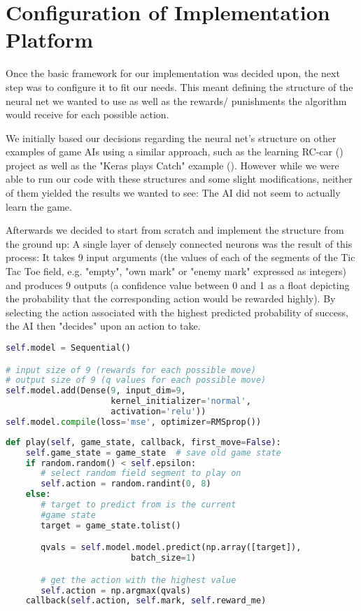 \section{Configuration of Implementation Platform}

Once the basic framework for our implementation was decided upon, the next step was to configure it to fit our needs. This meant defining the structure of the neural net we wanted to use as well as the rewards/ punishments the algorithm would receive for each possible action.

We initially based our decisions regarding the neural net's structure on other examples of game \ac{AI}s using a similar approach, such as the learning RC-car (\cite{Harvey2017}) project as well as the "Keras plays Catch" example (\cite{Santana17}). However while we were able to run our code with these structures and some slight modifications, neither of them yielded the results we wanted to see: The \ac{AI} did not seem to actually learn the game.

Afterwards we decided to start from scratch and implement the structure from the ground up: A single layer of densely connected neurons was the result of this process: It takes 9 input arguments (the values of each of the segments of the Tic Tac Toe field, e.g. "empty", "own mark" or "enemy mark" expressed as integers) and produces 9 outputs (a confidence value between 0 and 1 as a float depicting the probability that the corresponding action would be rewarded highly). By selecting the action associated with the highest predicted probability of success, the \ac{AI} then "decides" upon an action to take.
\begin{lstlisting}[frame=single,language=Python,caption={Creation of our neural network},captionpos=b]
self.model = Sequential()

# input size of 9 (rewards for each possible move)
# output size of 9 (q values for each possible move)
self.model.add(Dense(9, input_dim=9,
                     kernel_initializer='normal',
                     activation='relu'))
self.model.compile(loss='mse', optimizer=RMSprop())
\end{lstlisting}
\newpage

\begin{lstlisting}[frame=single,language=Python,caption={Method of given next action},captionpos=b]
def play(self, game_state, callback, first_move=False):             
    self.game_state = game_state  # save old game state
    if random.random() < self.epsilon:
       # select random field segment to play on
       self.action = random.randint(0, 8)
    else:
       # target to predict from is the current 
       #game state
       target = game_state.tolist()

       qvals = self.model.model.predict(np.array([target]),
       					 batch_size=1)

       # get the action with the highest value
       self.action = np.argmax(qvals)
    callback(self.action, self.mark, self.reward_me)
\end{lstlisting}


